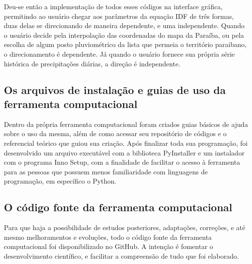 Deu-se então a implementação de todos esses códigos na interface gráfica, permitindo ao usuário chegar aos parâmetros da equação IDF de três formas, duas delas se direcionando de maneira dependente, e uma independente. Quando o usuário decide pela interpolação das coordenadas do mapa da Paraíba, ou pela escolha de algum posto pluviométrico da lista que permeia o território paraibano, o direcionamento é dependente. Já quando o usuário fornece sua própria série histórica de precipitações diárias, a direção é independente. 

\subsection{Os arquivos de instalação e guias de uso da ferramenta computacional}

Dentro da própria ferramenta computacional foram criados guias básicos de ajuda sobre o uso da mesma, além de como acessar seu repositório de códigos e o referencial teórico que guiou sua criação. Após finalizar toda sua programação, foi desenvolvido um arquivo executável com a biblioteca PyInstaller e um instalador com o programa Inno Setup, com a finalidade de facilitar o acesso à ferramenta para as pessoas que possuem menos familiaridade com linguagens de programação, em específico o Python.

\subsection{O código fonte da ferramenta computacional}

Para que haja a possibilidade de estudos posteriores, adaptações, correções, e até mesmo melhoramentos e evoluções, todo o código fonte da ferramenta computacional foi disponibilizado no GitHub. A intenção é fomentar o desenvolvimento científico, e facilitar a compreensão de tudo que foi elaborado.


